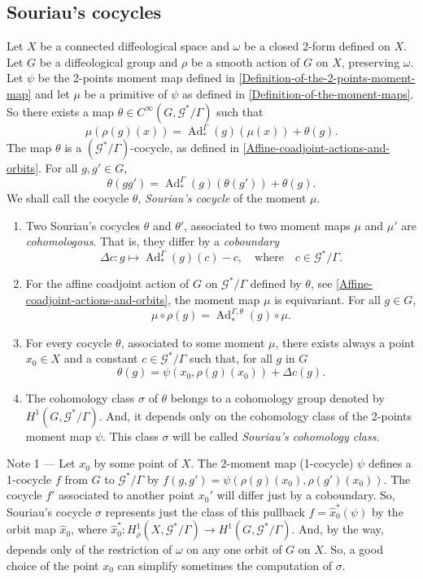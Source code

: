 \documentclass[10pt,reqno,twoside]{amsart}
\newcommand{\qmbox}[1]{\quad\mbox{#1}\quad}
\newcommand{\cG}{\mathcal{G}}
\DeclareMathOperator{\Ad}{Ad}
\newcommand{\Cinfty}{C^\infty}
\theoremstyle{plain}
\theoremstyle{definition}
\newcommand{\article}[1]{\subsection{#1}}
\begin{document}
  \article{Souriau's cocycles}
  \label{Souriau-cocycles}
  Let $X$ be a connected diffeological space and $\omega$ be a closed 2-form defined on $X$.
  Let $G$ be a diffeological group and $\rho$ be a smooth action of $G$ on $X$,
  preserving $\omega$.
  Let $\psi$ be the 2-points moment map defined in \ref{Definition-of-the-2-points-moment-map} and let $\mu$ be a primitive of $\psi$ as defined in \ref{Definition-of-the-moment-maps}.
  So there exists a map $\theta \in \Cinfty(G,\cG^*\!/\Gamma)$ such that
  $$
    \mu(\rho(g)(x)) = \Ad_*^\Gamma(g)(\mu(x)) + \theta(g).
    $$
  The map $\theta$ is a $(\cG^*\!/\Gamma)$-cocycle,
  as defined in \ref{Affine-coadjoint-actions-and-orbits}.
  For all $g,g' \in G$,
  $$
    \theta(gg') = \Ad_*^\Gamma(g)(\theta(g')) + \theta(g).
    $$
  We shall call the cocycle $\theta$,
  {\em Souriau's cocycle} of the moment $\mu$.
  \begin{enumerate}
    \item Two Souriau's cocycles $\theta$ and $\theta'$, associated to two moment maps $\mu$ and $\mu'$ are {\em cohomologous\/}.
    That is, they differ by a {\em coboundary}
    $$
      \Delta c : g \mapsto \Ad_*^\Gamma(g)(c) -c, \qmbox{where} c \in \cG^*\!/\Gamma.
      $$
    \item For the affine coadjoint action of $G$ on $\cG^*\!/\Gamma$ defined by $\theta$, see \ref{Affine-coadjoint-actions-and-orbits},
    the moment map $\mu$ is equivariant. For all $g \in G$,
    $$
      \mu \circ \rho(g) = \Ad_*^{\Gamma,\theta}(g) \circ \mu.
      $$
    \item For every cocycle $\theta$, associated to some moment $\mu$, there exists always a point $x_0 \in X$ and a constant $c \in \cG^*\!/\Gamma$ such that,
    for all $g$ in $G$
    $$
      \theta(g) = \psi(x_0,\rho(g)(x_0)) + \Delta c(g).
      $$
    \item The cohomology class $\sigma$ of $\theta$ belongs to a cohomology group denoted by \linebreak
    $H^1(G,\cG^*\!/\Gamma)$.
    And, it depends only on the cohomology class of the 2-points moment map $\psi$. This class $\sigma$ will be called {\em Souriau's cohomology class}.
  \end{enumerate}
  {\sc Note 1} --- Let $x_0$ by some point of $X$.
  The 2-moment map (1-cocycle) $\psi$ defines a 1-cocycle $f$ from $G$ to $\cG^*\!/\Gamma$ by $f(g,g') = \psi(\rho(g)(x_0),\rho(g')(x_0))$.
  The cocycle $f'$ associated to another point $x_0'$ will differ just by a coboundary.
  So,
  Souriau's cocycle $\sigma$ represents just the class of this pullback $f = \hat x_0^*(\psi)$ by the orbit map $\hat x_0$,
  where $\hat x_0^* : H^1_\rho(X,\cG^*\!/\Gamma) \to H^1(G,\cG^*\!/\Gamma)$.
  And,
  by the way,
  depends only of the restriction of $\omega$ on any one orbit of $G$ on $X$.
  So,
  a good choice of the point $x_0$ can simplify sometimes the computation of $\sigma$.
  
\end{document}
